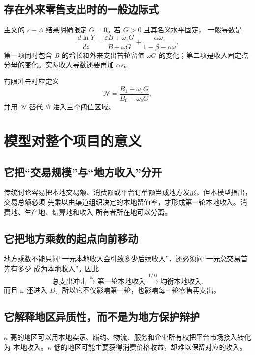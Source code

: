 \documentclass[UTF8,11pt,scheme=chinese,fontset=fandol]{ctexart}
\newcommand{\calB}{\mathcal B}
\theoremstyle{definition}
\begin{document}
\subsection{存在外来零售支出时的一般边际式}

主文的 \(\varepsilon-\Lambda\) 结果明确限定 \(G=0\)。若 \(G>0\) 且其名义水平固定，
一般导数是
\begin{equation}
\frac{d\ln Y}{dz}
=\frac{\varepsilon B+\omega_zG}{B+\omega G}
+\frac{\alpha\omega_z}{1-\beta-\alpha\omega}.
\label{teach:eq:G-positive}
\end{equation}
第一项同时包含 \(B\) 的增长和外来支出首轮留值 \(\omega G\) 的变化；第二项是收入固定点
分母的变化。实际收入导数还要再加 \(\alpha s\)。

有限冲击时应定义
\[
\mathcal N=\frac{B_1+\omega_1G}{B_0+\omega_0G},
\]
并用 \(\mathcal N\) 替代 \(\calB\) 进入三个阈值区域。

\section{模型对整个项目的意义}

\subsection{它把“交易规模”与“地方收入”分开}

传统讨论容易把本地交易额、消费额或平台订单额当成地方发展。但本模型指出，交易总额必须
先乘以由渠道组织决定的本地留值率，才形成第一轮本地收入。消费地、生产地、结算地和收入
所有者所在地可以分离。

\subsection{它把地方乘数的起点向前移动}

地方乘数不能只问“一元本地收入会引致多少后续收入”，还必须问“一元总交易首先有多少
成为本地收入”。因此
\[
\text{总支出冲击}
\xrightarrow{\ \omega\ }
\text{第一轮本地收入}
\xrightarrow{\ 1/D\ }
\text{均衡本地收入}.
\]
而且 \(\omega\) 还进入 \(D\)，所以它不仅影响第一轮，也影响每一轮零售再支出。

\subsection{它解释地区异质性，而不是为地方保护辩护}

\(\kappa\) 高的地区可以用本地卖家、履约、物流、服务和企业所有权把平台市场接入转化为
本地收入。\(\kappa\) 低的地区可能主要获得消费价格收益，却难以保留对应的收入。
\end{document}
